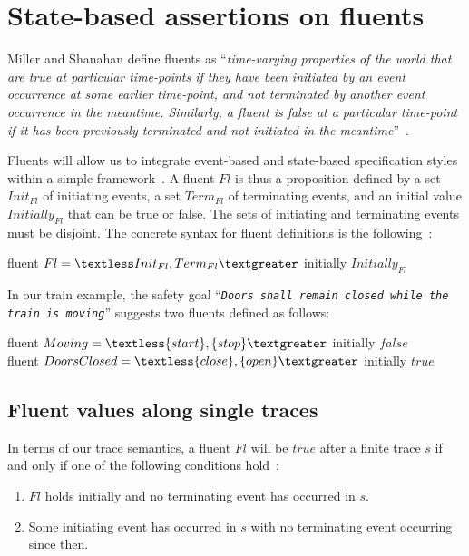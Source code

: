\section{State-based assertions on fluents\label{section:background-fluents}}

Miller and Shanahan define fluents as ``\emph{time-varying properties of the world that are true at particular time-points if they have been initiated by an event occurrence at some earlier time-point, and not terminated by another event occurrence in the meantime. Similarly, a fluent is false at a particular time-point if it has been previously terminated and not initiated in the meantime}''~\cite{Miller:2002}.

Fluents will allow us to integrate event-based and state-based specification styles within a simple framework~\cite{Giannakopoulou:2003}. A fluent $Fl$ is thus a proposition defined by a set $Init_{Fl}$ of initiating events, a set $Term_{Fl}$ of terminating events, and an initial value $Initially_{Fl}$ that can be true or false. The sets of initiating and terminating events must be disjoint. The concrete syntax for fluent definitions is the following~\cite{Giannakopoulou:2003}:

\begin{center}
fluent $Fl = \textless Init_{Fl}, Term_{Fl} \textgreater $ initially $Initially_{Fl}$
\end{center}

In our train example, the safety goal ``\emph{\texttt{Doors shall remain closed while the train is moving}}'' suggests two fluents defined as follows:

\begin{center}
fluent $Moving = \textless \{start\}, \{stop\} \textgreater $ initially $false$ \\
fluent $DoorsClosed = \textless \{close\}, \{open\} \textgreater $ initially $true$ \\
\end{center}

\subsection{Fluent values along single traces}

In terms of our trace semantics, a fluent $Fl$ will be $true$ after a finite trace $s$ if and only if one of the following conditions hold~\cite{Giannakopoulou:2003}:

\begin{enumerate}
\item $Fl$ holds initially and no terminating event has occurred in $s$.
\item Some initiating event has occurred in $s$ with no terminating event occurring since then.
\end{enumerate}

